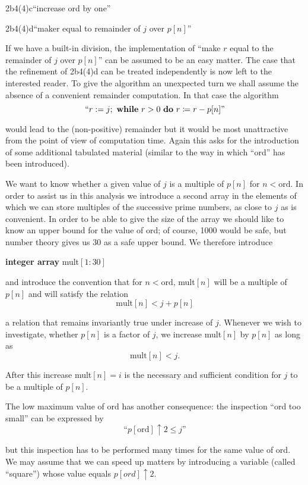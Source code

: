 \noindent
2b4(4)c\quad\quad ``increase ord by one''

\noindent
2b4(4)d\quad\quad ``maker equal to remainder of $j$ over $p[n]$''

If we have a built-in division, the implementation of ``make $r$ equal to the remainder of $j$ over $p[n]$'' can be assumed to be an easy matter. The case that the refinement of 2b4(4)d can be treated independently is now left to the interested reader. To give the algorithm an unexpected turn we shall assume the absence of a convenient remainder computation. In that case the algorithm
$$
\text{``}r: = j;\text{ \textbf{while} } r > 0\text{ \textbf{do} } r \coloneq r - p[n]\text{''}
$$

\noindent
would lead to the (non-positive) remainder but it would be most unattractive from the point of view of computation time. Again this asks for the introduction of some additional tabulated material (similar to the way in which ``ord'' has been introduced).

We want to know whether a given value of $j$ is a multiple of $p[n]$ for $n < \text{ord}$. In order to assist us in this analysis we introduce a second array in the elements of which we can store multiples of the successive prime numbers, as close to $j$ as is convenient. In order to be able to give the size of the array we should like to know an upper bound for the value of ord; of course, 1000 would be safe, but number theory gives us 30 as a safe upper bound. We therefore introduce

\noindent
\textbf{integer array} mult$[1 : 30]$

\noindent
and introduce the convention that for $n < \text{ord}$, mult$[n]$ will be a multiple of $p[n]$ and will satisfy the relation
$$
\text{mult}[n] < j + p[n]
$$

\noindent
a relation that remains invariantly true under increase of $j$. Whenever we wish to investigate, whether $p[n]$ is a factor of $j$, we increase mult$[n]$ by $p[n]$ as long as
$$
\text{mult}[n] < j.
$$

\noindent
After this increase mult$[n] = i$ is the necessary and sufficient condition for $j$ to be a multiple of $p[n]$.

The low maximum value of ord has another consequence: the inspection ``ord too small'' can be expressed by
$$
\text{``}p[\text{ord}] \uparrow 2 \leqslant j\text{''}
$$

\noindent
but this inspection has to be performed many times for the same value of ord. We may assume that we can speed up matters by introducing a variable (called ``square'') whose value equals $p[ord] \uparrow 2$.


